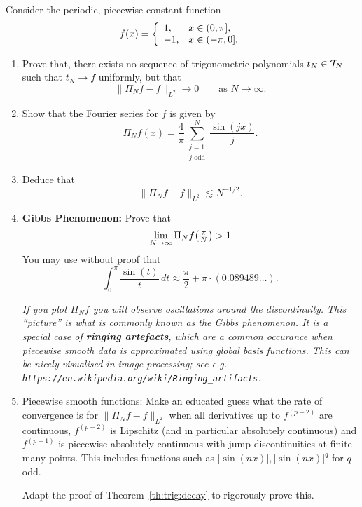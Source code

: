 \begin{exercise} \label{exr:trig:gibbs}
  Consider the periodic, piecewise constant function
  \[
      f(x) = \left\{ \begin{array}{ll} 
        1, & x \in (0, \pi], \\
        -1, & x \in (-\pi, 0].
       \end{array} \right.
  \]
  \begin{enumerate} \ilist
  \item Prove that, there exists no sequence of trigonometric polynomials
  $t_N \in \mathcal{T}_N$ such that $t_N \to f$ uniformly, but that
  \[
    \|\Pi_N f - f\|_{L^2} \to 0 \qquad \text{as } N \to \infty.
  \]

  \item Show that the Fourier series for $f$ is given by
  \[
    \Pi_N f(x) = \frac{4}{\pi} \sum_{\substack{j = 1 \\ j \text{ odd}}}^{N}
        \frac{\sin(jx)}{j}.
  \]

  \item Deduce that
  \[
      \| \Pi_N f - f \|_{L^2} \lesssim N^{-1/2}.
  \]

  \item {\bf Gibbs Phenomenon: } Prove that
  \[
    \lim_{N \to \infty} \Pi_N f\big({\textstyle \frac{\pi}{N}} \big) > 1
  \]
  You may use without proof that
  \[
      \int_0^\pi \frac{\sin(t)}{t} \,dt \approx
      \frac{\pi}{2} + \pi \cdot (0.089489\dots).
  \]

  {\it If you plot $\Pi_N f$ you will observe oscillations around the
  discontinuity. This ``picture'' is what is commonly known as the Gibbs
  phenomenon. It is a special case of {\bf ringing artefacts}, which are
  a common occurance when piecewise smooth data is approximated using
  global basis functions. This can be nicely visualised in image processing;
  see e.g. {\tt https://en.wikipedia.org/wiki/Ringing\_artifacts}.}

  \item {Piecewise smooth functions: } Make an educated guess what the
  rate of convergence is for $\|\Pi_N f - f \|_{L^2}$ when all derivatives up to $f^{(p-2)}$ are continuous, $f^{(p-2)}$ is Lipschitz (and in particular absolutely continuous) and $f^{(p-1)}$ is piecewise absolutely continuous with jump discontinuities at finite many points. This includes
  functions such as $|\sin(nx)|, |\sin(nx)|^q$ for $q$ odd.

  Adapt the proof of Theorem~\ref{th:trig:decay} to rigorously prove this.
  \qedhere
  \end{enumerate}
\end{exercise}


